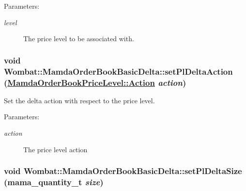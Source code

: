 \begin{Desc}
\item[Parameters:]
\begin{description}
\item[{\em level}]The price level to be associated with. \end{description}
\end{Desc}
\hypertarget{classWombat_1_1MamdaOrderBookBasicDelta_6dc1d989eee8644c10006986976d26e2}{
\subsubsection[setPlDeltaAction]{\setlength{\rightskip}{0pt plus 5cm}void Wombat::Mamda\-Order\-Book\-Basic\-Delta::set\-Pl\-Delta\-Action (\hyperlink{classWombat_1_1MamdaOrderBookPriceLevel_bd3407b4250fc6f7a42d94b6d32e358a}{Mamda\-Order\-Book\-Price\-Level::Action} {\em action})}}
\label{classWombat_1_1MamdaOrderBookBasicDelta_6dc1d989eee8644c10006986976d26e2}


Set the delta action with respect to the price level. 

\begin{Desc}
\item[Parameters:]
\begin{description}
\item[{\em action}]The price level action \end{description}
\end{Desc}
\hypertarget{classWombat_1_1MamdaOrderBookBasicDelta_bc98251910a63a9b698ab55f7f514124}{
\subsubsection[setPlDeltaSize]{\setlength{\rightskip}{0pt plus 5cm}void Wombat::Mamda\-Order\-Book\-Basic\-Delta::set\-Pl\-Delta\-Size (mama\_\-quantity\_\-t {\em size})}}
\label{classWombat_1_1MamdaOrderBookBasicDelta_bc98251910a63a9b698ab55f7f514124}


